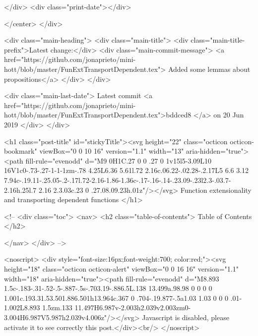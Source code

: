           
        </div>
        <div class="print-date"></div>
        
        
    </center>
  </div>

  
  <div class="main-heading">
    <div class="main-title">
      <div class="main-title-prefix">Latest change:</div>
      <div class="main-commit-message">
            <a href="https://github.com/jonaprieto/mini-hott/blob/master/FunExtTransportDependent.tex">
              Added some lemmas about propositions</a>
      </div>
    </div>

    <div class="main-last-date">
      Latest commit <a href="https://github.com/jonaprieto/mini-hott/blob/master/FunExtTransportDependent.tex">bddced8 </a> on  20 Jun 2019
    </div>
  </div>
  
  <h1 class="post-title" id="stickyTitle"><svg height="22" class="octicon octicon-bookmark" viewBox="0 0 10 16" version="1.1" width="13" aria-hidden="true"><path fill-rule="evenodd" d="M9 0H1C.27 0 0 .27 0 1v15l5-3.09L10 16V1c0-.73-.27-1-1-1zm-.78 4.25L6.36 5.61l.72 2.16c.06.22-.02.28-.2.17L5 6.6 3.12 7.94c-.19.11-.25.05-.2-.17l.72-2.16-1.86-1.36c-.17-.16-.14-.23.09-.23l2.3-.03.7-2.16h.25l.7 2.16 2.3.03c.23 0 .27.08.09.23h.01z"/></svg> Function extensionality and transporting dependent functions 
  </h1>

  <!-- 
  <div class="toc">
    <nav>
    <h2 class="table-of-contents"> Table of Contents </h2>
      

    </nav>
  </div>
   -->

  <noscript>
  <div style="font-size:16px;font-weight:700; color:red;"><svg height="18" class="octicon octicon-alert" viewBox="0 0 16 16" version="1.1" width="18" aria-hidden="true"><path fill-rule="evenodd" d="M8.893 1.5c-.183-.31-.52-.5-.887-.5s-.703.19-.886.5L.138 13.499a.98.98 0 0 0 0 1.001c.193.31.53.501.886.501h13.964c.367 0 .704-.19.877-.5a1.03 1.03 0 0 0 .01-1.002L8.893 1.5zm.133 11.497H6.987v-2.003h2.039v2.003zm0-3.004H6.987V5.987h2.039v4.006z"/></svg> Javascript is disabled, please activate it to see correctly this post.</div><br/>
  </noscript>

